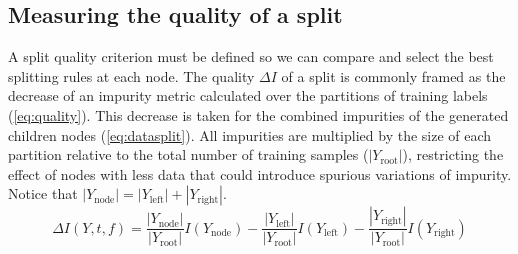 \algFindRandomSplit

%


\subsection{Measuring the quality of a split}
\label{sec:criteria}

A split quality criterion must be defined so we can compare and select the best splitting rules at each node. The quality $\Delta I$ of a split is commonly framed as the decrease of an impurity metric calculated over the partitions of training labels (\autoref{eq:quality}). This decrease is taken for the combined impurities of the generated children nodes (\autoref{eq:datasplit}).
All impurities are multiplied by the size of each partition relative to the total number of training samples ($|Y_\text{root}|$), restricting the effect of nodes with less data that could introduce spurious variations of impurity. Notice that $|Y_\text{node}|=|Y_\text{left}|+|Y_\text{right}|$.
%
\begin{equation}
    \Delta I(Y, t, f) =
        \frac{|Y_\text{node}|}{|Y_\text{root}|} I(Y_\text{node})
        - \frac{|Y_\text{left}|}{|Y_\text{root}|} I(Y_\text{left})
        - \frac{|Y_\text{right}|}{|Y_\text{root}|} I(Y_\text{right})
    \label{eq:quality}
\end{equation}

